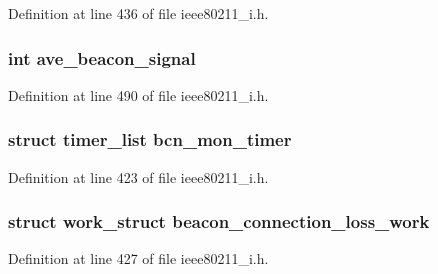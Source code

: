 Definition at line 436 of file ieee80211\-\_\-i.\-h.

\hypertarget{structieee80211__if__managed_a1ca783bf10e019313e237620d1dab5b1}{
\subsubsection[{ave\-\_\-beacon\-\_\-signal}]{\setlength{\rightskip}{0pt plus 5cm}int ave\-\_\-beacon\-\_\-signal}}\label{structieee80211__if__managed_a1ca783bf10e019313e237620d1dab5b1}


Definition at line 490 of file ieee80211\-\_\-i.\-h.

\hypertarget{structieee80211__if__managed_af3925492fec1b2070226f61652566dad}{
\subsubsection[{bcn\-\_\-mon\-\_\-timer}]{\setlength{\rightskip}{0pt plus 5cm}struct timer\-\_\-list bcn\-\_\-mon\-\_\-timer}}\label{structieee80211__if__managed_af3925492fec1b2070226f61652566dad}


Definition at line 423 of file ieee80211\-\_\-i.\-h.

\hypertarget{structieee80211__if__managed_af67aa5a3888b63ed23edc726fb2d6ce1}{
\subsubsection[{beacon\-\_\-connection\-\_\-loss\-\_\-work}]{\setlength{\rightskip}{0pt plus 5cm}struct work\-\_\-struct beacon\-\_\-connection\-\_\-loss\-\_\-work}}\label{structieee80211__if__managed_af67aa5a3888b63ed23edc726fb2d6ce1}


Definition at line 427 of file ieee80211\-\_\-i.\-h.

